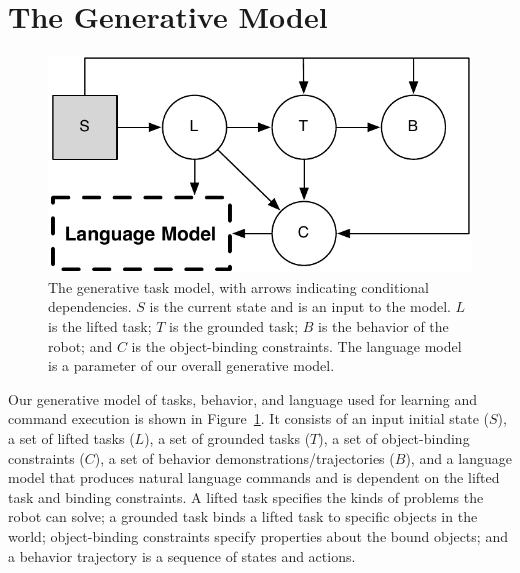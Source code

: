\documentclass[conference]{IEEEtran}
\begin{document}
\section{The Generative Model}
\begin{figure}[tbp]
\begin{center}
\includegraphics[width=.7\columnwidth]{images/taskModel}
\caption{\small The generative task model, with arrows indicating conditional dependencies. $S$ is the current state and is an input to the model. $L$ is the lifted task; $T$ is the grounded task; $B$ is the behavior of the robot; and $C$ is the object-binding constraints. The language model is a parameter of our overall generative model.}
\label{fig:tm}
\end{center}
\end{figure}
Our generative model of tasks, behavior, and language used for learning and command execution is shown in Figure~\ref{fig:tm}. It consists of an input initial state ($S$), a set of lifted tasks ($L$), a set of grounded tasks ($T$), a set of object-binding constraints ($C$), a set of behavior demonstrations/trajectories ($B$), and a language model that produces natural language commands and is dependent on the lifted task and binding constraints. A lifted task specifies the kinds of problems the robot can solve; a grounded task binds a lifted task to specific objects in the world; object-binding constraints specify properties about the bound objects; and a behavior trajectory is a sequence of states and actions. 
\end{document}

